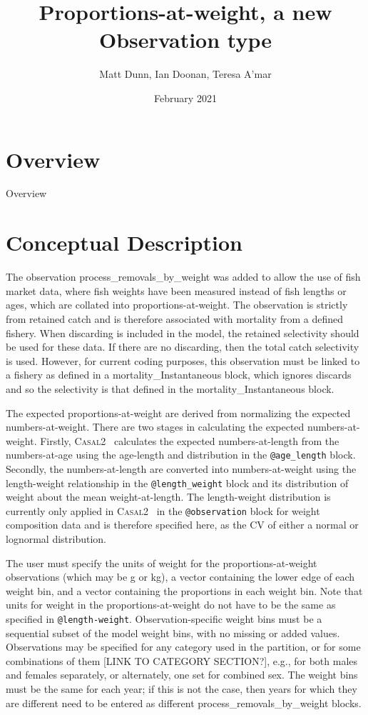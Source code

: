 \documentclass[a4paper,11pt,twoside,pdftex,draft]{article}
\title{Proportions-at-weight, a new Observation type}
\author{Matt Dunn, Ian Doonan, Teresa A'mar}
\date{February 2021}
\newcommand{\CNAME}{\textsc{Casal2}}
\begin{document}
\maketitle

\pagestyle{plain}
\setcounter{page}{1}


\newpage

\section{Overview}

Overview

\section{Conceptual Description}

The observation process\_removals\_by\_weight was added to allow the use of fish market data, where fish weights have been measured instead of fish lengths or ages, which are collated into proportions-at-weight. The observation is strictly from retained catch and is therefore associated with mortality from a defined fishery. When discarding is included in the model, the retained selectivity should be used for these data. If there are no discarding, then the total catch selectivity is used. However, for current coding purposes, this observation must be linked to a fishery as defined in a mortality\_Instantaneous block, which ignores discards and so the selectivity is that defined in the mortality\_Instantaneous block.

The expected proportions-at-weight are derived from normalizing the expected numbers-at-weight. There are two stages in calculating the expected numbers-at-weight. Firstly, \CNAME~ calculates the expected numbers-at-length from the numbers-at-age using the age-length and distribution in the \texttt{@age\_length} block. Secondly, the numbers-at-length are converted into numbers-at-weight using the length-weight relationship in the \texttt{@length\_weight} block and its distribution of weight about the mean weight-at-length. The length-weight distribution is currently only applied in \CNAME~ in the \texttt{@observation} block for weight composition data and is therefore specified here, as the CV of either a normal or lognormal distribution.

The user must specify the units of weight for the proportions-at-weight observations (which may be g or kg), a vector containing the lower edge of each weight bin, and a vector containing the proportions in each weight bin. Note that units for weight in the proportions-at-weight do not have to be the same as specified in \texttt{@length-weight}. Observation-specific weight bins must be a sequential subset of the model weight bins, with no missing or added values. Observations may be specified for any category used in the partition, or for some combinations of them [LINK TO CATEGORY SECTION?], e.g., for both males and females separately, or alternately, one set for combined sex. The weight bins must be the same for each year; if this is not the case, then years for which they are different need to be entered as different process\_removals\_by\_weight blocks.
\end{document}
